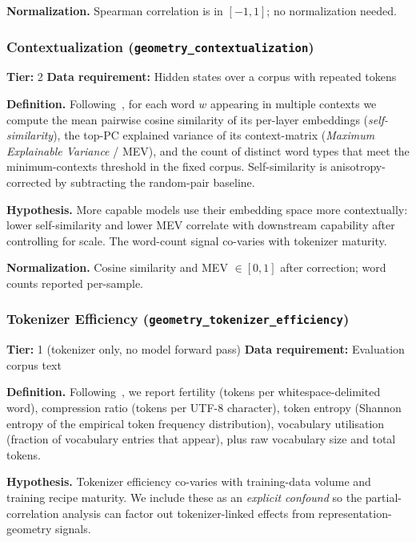 \documentclass[preprint]{neurips_2025}
\begin{document}
\textbf{Normalization.} Spearman correlation is in $[-1, 1]$; no normalization needed.

\subsubsection{Contextualization (\texttt{geometry\_contextualization})}
\label{app:contextualization}

\textbf{Tier:} 2 \quad \textbf{Data requirement:} Hidden states over a corpus with repeated tokens

\textbf{Definition.} Following~\citet{ethayarajh2019contextual}, for each word $w$ appearing in multiple contexts we compute the mean pairwise cosine similarity of its per-layer embeddings (\emph{self-similarity}), the top-PC explained variance of its context-matrix (\emph{Maximum Explainable Variance} / MEV), and the count of distinct word types that meet the minimum-contexts threshold in the fixed corpus. Self-similarity is anisotropy-corrected by subtracting the random-pair baseline.

\textbf{Hypothesis.} More capable models use their embedding space more contextually: lower self-similarity and lower MEV correlate with downstream capability after controlling for scale. The word-count signal co-varies with tokenizer maturity.

\textbf{Normalization.} Cosine similarity and MEV $\in [0,1]$ after correction; word counts reported per-sample.

\subsubsection{Tokenizer Efficiency (\texttt{geometry\_tokenizer\_efficiency})}
\label{app:tokenizer-efficiency}

\textbf{Tier:} 1 (tokenizer only, no model forward pass) \quad \textbf{Data requirement:} Evaluation corpus text

\textbf{Definition.} Following~\citet{rust2021tokenizer}, we report fertility (tokens per whitespace-delimited word), compression ratio (tokens per UTF-8 character), token entropy (Shannon entropy of the empirical token frequency distribution), vocabulary utilisation (fraction of vocabulary entries that appear), plus raw vocabulary size and total tokens.

\textbf{Hypothesis.} Tokenizer efficiency co-varies with training-data volume and training recipe maturity. We include these as an \emph{explicit confound} so the partial-correlation analysis can factor out tokenizer-linked effects from representation-geometry signals.
\end{document}
